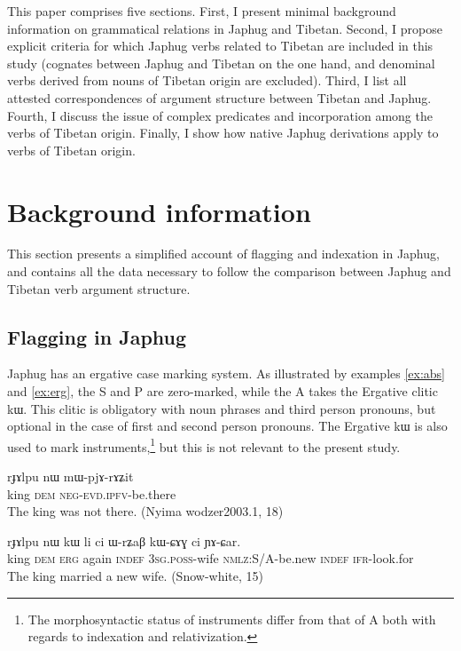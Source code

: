 \documentclass[oldfontcommands,oneside,a4paper,11pt]{article}
\newcommand{\ipa}[1]{{\phon \mbox{#1}}} %
\begin{document}
This paper comprises five sections. First, I present minimal background information on grammatical relations in Japhug and Tibetan. Second, I propose explicit criteria for which Japhug verbs related to Tibetan are included in this study (cognates between Japhug and Tibetan on the one hand, and denominal verbs derived from nouns of Tibetan origin are excluded). Third, I list all attested correspondences of argument structure between Tibetan and Japhug. Fourth, I discuss the issue of complex predicates and incorporation among the verbs of Tibetan origin. Finally, I show how native Japhug derivations apply to verbs of Tibetan origin.

\section{Background information}
This section presents a simplified account of flagging and indexation in Japhug, and contains all the data necessary to follow the comparison between Japhug and Tibetan verb argument structure.

\subsection{Flagging in Japhug}
Japhug has an ergative case marking system. As illustrated by examples \ref{ex:abs} and \ref{ex:erg}, the S and P are zero-marked, while the A takes the Ergative clitic \ipa{kɯ}. This clitic is obligatory with noun phrases and third person pronouns, but optional in the case of first and second person pronouns. The Ergative \ipa{kɯ} is also used to mark instruments,\footnote{The morphosyntactic status of instruments differ from that of A both with regards to indexation and relativization.} but this is not relevant to the present study.

 \begin{exe}
\ex \label{ex:abs}
\gll
\ipa{rɟɤlpu}  	\ipa{nɯ}  	\ipa{mɯ-pjɤ-rɤʑit}  \\
king \textsc{dem} \textsc{neg-evd.ipfv}-be.there \\
 \glt The king was not there. (Nyima wodzer2003.1, 18)
\end{exe}

 \begin{exe}
\ex \label{ex:erg}
\gll 
\ipa{rɟɤlpu}  	\ipa{nɯ}  	\ipa{kɯ}  	\ipa{li}  	\ipa{ci}  	\ipa{ɯ-rʑaβ}  	\ipa{kɯ-ɕɤɣ}  	\ipa{ci}  	\ipa{ɲɤ-ɕar.}  	 \\
king \textsc{dem} \textsc{erg} again \textsc{indef} \textsc{3sg.poss}-wife \textsc{nmlz}:S/A-be.new \textsc{indef}  \textsc{ifr}-look.for \\
\glt The king married a new wife. (Snow-white, 15)
\end{exe}
\end{document}
